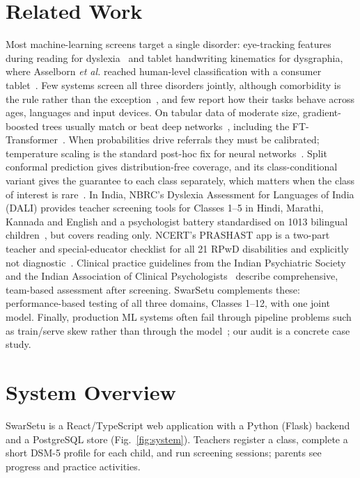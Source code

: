 \documentclass[conference]{IEEEtran}
\begin{document}
\section{Related Work}
Most machine-learning screens target a single disorder: eye-tracking features during reading for dyslexia~\cite{rello2015} and tablet handwriting kinematics for dysgraphia, where Asselborn \emph{et al.} reached human-level classification with a consumer tablet~\cite{asselborn2018}. Few systems screen all three disorders jointly, although comorbidity is the rule rather than the exception~\cite{willcutt2013}, and few report how their tasks behave across ages, languages and input devices. On tabular data of moderate size, gradient-boosted trees usually match or beat deep networks~\cite{grinsztajn2022}, including the FT-Transformer~\cite{gorishniy2021}. When probabilities drive referrals they must be calibrated; temperature scaling is the standard post-hoc fix for neural networks~\cite{guo2017}. Split conformal prediction gives distribution-free coverage, and its class-conditional variant gives the guarantee to each class separately, which matters when the class of interest is rare~\cite{angelopoulos2021}. In India, NBRC's Dyslexia Assessment for Languages of India (DALI) provides teacher screening tools for Classes 1--5 in Hindi, Marathi, Kannada and English and a psychologist battery standardised on 1013 bilingual children~\cite{dali2021}, but covers reading only. NCERT's PRASHAST app is a two-part teacher and special-educator checklist for all 21 RPwD disabilities and explicitly not diagnostic~\cite{prashast2022}. Clinical practice guidelines from the Indian Psychiatric Society~\cite{shah2019ips} and the Indian Association of Clinical Psychologists~\cite{iacp2020} describe comprehensive, team-based assessment after screening. SwarSetu complements these: performance-based testing of all three domains, Classes 1--12, with one joint model. Finally, production ML systems often fail through pipeline problems such as train/serve skew rather than through the model~\cite{sculley2015}; our audit is a concrete case study.

\section{System Overview}
SwarSetu is a React/TypeScript web application with a Python (Flask) backend and a PostgreSQL store (Fig.~\ref{fig:system}). Teachers register a class, complete a short DSM-5 profile for each child, and run screening sessions; parents see progress and practice activities.
\end{document}
